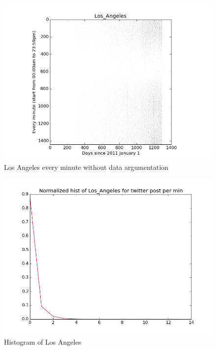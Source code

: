 \documentclass[a4paper,12pt]{article}
\begin{document}
\begin{figure}[H]
  \begin{center}
      \includegraphics[scale=0.8]{Los_Angeles.png}
\end{center}
\caption{Los Angeles every minute without data argumentation}
 \label {fig:2}
 \end{figure}
 
 \begin{figure}[H]
  \begin{center}
      \includegraphics[scale=0.8]{Los_Angeleshisto.png}
\end{center}
\caption{Histogram of Los Angeles }
 \label {fig:2}
 \end{figure}
 
\end{document}
